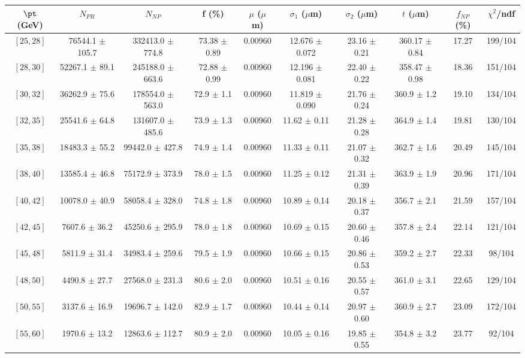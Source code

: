 \begin{tabular}{c||c|c|c|c|c|c|c||c|c}
$\pt$ (GeV) & $N_{PR}$ & $N_{NP}$ & f (\%) & $\mu$ ($\mu$m) & $\sigma_1$ ($\mu$m) & $\sigma_2$ ($\mu$m)  & $t$ ($\mu$m) & $f_{NP}$ (\%) & $\chi^2$/ndf \\
\hline
$[25, 28]$ & 76544.1 $\pm$ 105.7 & 332413.0 $\pm$ 774.8 & 73.38 $\pm$ 0.89 & 0.00960 & 12.676 $\pm$ 0.072 & 23.16 $\pm$ 0.21 & 360.17 $\pm$ 0.84 & 17.27 & 199/104\\
$[28, 30]$ & 52267.1 $\pm$ 89.1 & 245188.0 $\pm$ 663.6 & 72.88 $\pm$ 0.99 & 0.00960 & 12.196 $\pm$ 0.081 & 22.40 $\pm$ 0.22 & 358.47 $\pm$ 0.98 & 18.36 & 151/104\\
$[30, 32]$ & 36262.9 $\pm$ 75.6 & 178554.0 $\pm$ 563.0 & 72.9 $\pm$ 1.1 & 0.00960 & 11.819 $\pm$ 0.090 & 21.76 $\pm$ 0.24 & 360.9 $\pm$ 1.2 & 19.10 & 134/104\\
$[32, 35]$ & 25541.6 $\pm$ 64.8 & 131607.0 $\pm$ 485.6 & 73.9 $\pm$ 1.3 & 0.00960 & 11.62 $\pm$ 0.11 & 21.28 $\pm$ 0.28 & 364.9 $\pm$ 1.4 & 19.81 & 130/104\\
$[35, 38]$ & 18483.3 $\pm$ 55.2 & 99442.0 $\pm$ 427.8 & 74.9 $\pm$ 1.4 & 0.00960 & 11.33 $\pm$ 0.11 & 21.07 $\pm$ 0.32 & 362.7 $\pm$ 1.6 & 20.49 & 145/104\\
$[38, 40]$ & 13585.4 $\pm$ 46.8 & 75172.9 $\pm$ 373.9 & 78.0 $\pm$ 1.5 & 0.00960 & 11.25 $\pm$ 0.12 & 21.31 $\pm$ 0.39 & 363.9 $\pm$ 1.9 & 20.96 & 171/104\\
$[40, 42]$ & 10078.0 $\pm$ 40.9 & 58058.4 $\pm$ 328.0 & 74.8 $\pm$ 1.8 & 0.00960 & 10.89 $\pm$ 0.14 & 20.18 $\pm$ 0.37 & 356.7 $\pm$ 2.1 & 21.59 & 157/104\\
$[42, 45]$ & 7607.6 $\pm$ 36.2 & 45250.6 $\pm$ 295.9 & 78.0 $\pm$ 1.8 & 0.00960 & 10.69 $\pm$ 0.15 & 20.60 $\pm$ 0.46 & 357.8 $\pm$ 2.4 & 22.14 & 121/104\\
$[45, 48]$ & 5811.9 $\pm$ 31.4 & 34983.4 $\pm$ 259.6 & 79.5 $\pm$ 1.9 & 0.00960 & 10.66 $\pm$ 0.15 & 20.86 $\pm$ 0.53 & 359.2 $\pm$ 2.7 & 22.33 & 98/104\\
$[48, 50]$ & 4490.8 $\pm$ 27.7 & 27568.0 $\pm$ 231.3 & 80.6 $\pm$ 2.0 & 0.00960 & 10.51 $\pm$ 0.16 & 20.55 $\pm$ 0.57 & 361.0 $\pm$ 3.1 & 22.65 & 129/104\\
$[50, 55]$ & 3137.6 $\pm$ 16.9 & 19696.7 $\pm$ 142.0 & 82.9 $\pm$ 1.7 & 0.00960 & 10.44 $\pm$ 0.14 & 20.97 $\pm$ 0.60 & 360.9 $\pm$ 2.7 & 23.09 & 172/104\\
$[55, 60]$ & 1970.6 $\pm$ 13.2 & 12863.6 $\pm$ 112.7 & 80.9 $\pm$ 2.0 & 0.00960 & 10.05 $\pm$ 0.16 & 19.85 $\pm$ 0.55 & 354.8 $\pm$ 3.2 & 23.77 & 92/104\\

\end{tabular}
